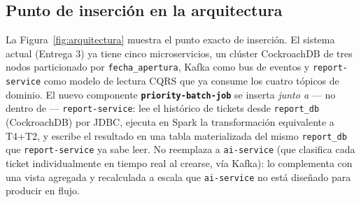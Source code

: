 \documentclass[11pt,a4paper]{article}
\begin{document}
\subsection{Punto de inserción en la arquitectura}

La Figura~\ref{fig:arquitectura} muestra el punto exacto de inserción. El sistema actual (Entrega
3) ya tiene cinco microservicios, un clúster CockroachDB de tres nodos particionado por
\texttt{fecha\_apertura}, Kafka como bus de eventos y \texttt{report-service} como modelo de
lectura CQRS que ya consume los cuatro tópicos de dominio. El nuevo componente
\textbf{\texttt{priority-batch-job}} se inserta \emph{junto a} --- no dentro de ---
\texttt{report-service}: lee el histórico de tickets desde \texttt{report\_db} (CockroachDB) por
JDBC, ejecuta en Spark la transformación equivalente a T4+T2, y escribe el resultado en una
tabla materializada del mismo \texttt{report\_db} que \texttt{report-service} ya sabe leer. No
reemplaza a \texttt{ai-service} (que clasifica cada ticket individualmente en tiempo real al
crearse, vía Kafka): lo complementa con una vista agregada y recalculada a escala que
\texttt{ai-service} no está diseñado para producir en flujo.
\end{document}
